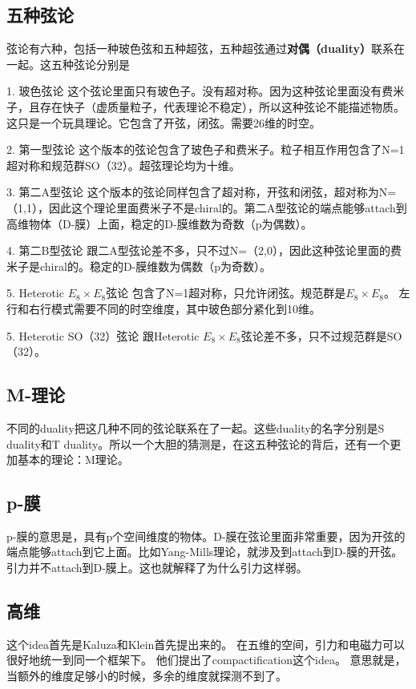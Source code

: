 
\begin{issues}
\issueNeedCite
\issueMissDepend
\end{issues}

\subsection{五种弦论}

弦论有六种，包括一种玻色弦和五种超弦，五种超弦通过\textbf{对偶（duality）}联系在一起。这五种弦论分别是

1. 玻色弦论
这个弦论里面只有玻色子。没有超对称。因为这种弦论里面没有费米子，且存在快子（虚质量粒子，代表理论不稳定），所以这种弦论不能描述物质。这只是一个玩具理论。它包含了开弦，闭弦。需要26维的时空。

2. 第一型弦论
这个版本的弦论包含了玻色子和费米子。粒子相互作用包含了N=1超对称和规范群SO（32）。超弦理论均为十维。

3. 第二A型弦论
这个版本的弦论同样包含了超对称，开弦和闭弦，超对称为N=（1,1），因此这个理论里面费米子不是chiral的。第二A型弦论的端点能够attach到高维物体（D-膜）上面，稳定的D-膜维数为奇数（p为偶数）。

4. 第二B型弦论
跟二A型弦论差不多，只不过N=（2,0），因此这种弦论里面的费米子是chiral的。稳定的D-膜维数为偶数（p为奇数）。

5. Heterotic $E_8\times E_8$弦论
包含了N=1超对称，只允许闭弦。规范群是$E_8\times E_8$。 左行和右行模式需要不同的时空维度，其中玻色部分紧化到10维。

5. Heterotic SO（32）弦论
跟Heterotic $E_8\times E_8$弦论差不多，只不过规范群是SO（32）。

\subsection{M-理论}
不同的duality把这几种不同的弦论联系在了一起。这些duality的名字分别是S duality和T duality。所以一个大胆的猜测是，在这五种弦论的背后，还有一个更加基本的理论：M理论。

\subsection{p-膜}
p-膜的意思是，具有p个空间维度的物体。D-膜在弦论里面非常重要，因为开弦的端点能够attach到它上面。比如Yang-Mills理论，就涉及到attach到D-膜的开弦。 引力并不attach到D-膜上。这也就解释了为什么引力这样弱。

\subsection{高维}
这个idea首先是Kaluza和Klein首先提出来的。 在五维的空间，引力和电磁力可以很好地统一到同一个框架下。 他们提出了compactification这个idea。
意思就是，当额外的维度足够小的时候，多余的维度就探测不到了。 
